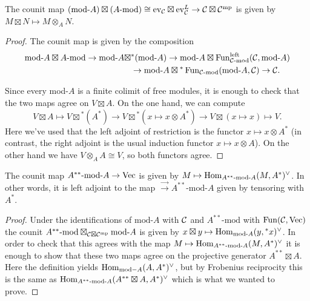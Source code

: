 \documentclass{amsart}
\begin{document}
\begin{lemma}
The counit map $(\text{mod-}A) \boxtimes (A\text{-mod}) \cong \ev_\cC \boxtimes \ev_\cC^L \rightarrow \cC \boxtimes \cC^\mp$ is given by $M \boxtimes N \mapsto M \otimes_A N$.
\end{lemma}
\begin{proof}
The counit map is given by the composition 
\begin{align*}
\text{mod-}A \boxtimes A\text{-mod} \rightarrow \text{mod-}A \boxtimes & {}^*(\text{mod-}A) \rightarrow \text{mod-}A \boxtimes \Fun_{\cC\text{-mod}}^{\text{left}}(\cC, \text{mod-}A) \\ 
& \rightarrow \text{mod-}A \boxtimes {}^*\Fun_{\cC\text{-mod}}(\text{mod-}A, \cC) \rightarrow \cC.
\end{align*}

Since every mod-$A$ is a finite colimit of free modules, it is enough to check that the two maps agree on $V \boxtimes A$.  On the one hand,
we can compute $$V \boxtimes A \mapsto V \boxtimes {}^*(A^*) \rightarrow V \boxtimes {}^*(x \mapsto x \otimes A^*) \rightarrow V \boxtimes (x \mapsto x) \mapsto V.$$  Here we've used that the left adjoint of restriction is the functor $x \mapsto x \otimes A^*$ (in contrast, the right adjoint is the usual induction functor $x \mapsto x \otimes A$).  On the other hand we have $V \otimes_A A \cong V$, so both functors agree.
\end{proof}

\begin{lemma}
The counit map $A^{**}\text{-mod-}A \rightarrow \Vec$ is given by $M \mapsto \Hom_{A^{**}\text{-mod-}A}(M, A^*)^\vee$.  In other words, it is left adjoint to the map $\Vec \rightarrow A^{**}\text{-mod-}A$ given by tensoring with $A^*$.
\end{lemma}
\begin{proof}
Under the identifications of $\text{mod-}A$ with $\cC$ and $A^{**}\text{-mod}$ with $\Fun(\cC, \Vec)$ the counit $A^{**}\text{-mod} \boxtimes_{\cC \boxtimes \cC^\mp} \text{mod-}A$ is given by $x \boxtimes y \mapsto \Hom_{\text{mod-}A}(y, {}^*x)^\vee$.  In order to check that this agrees with the map $M \mapsto \Hom_{A^{**}\text{-mod-}A}(M, A^*)^\vee$ it is enough to show that these two maps agree on the projective generator $A^{**} \boxtimes A$.  Here the definition yields $\Hom_{\text{mod}-A}(A, A^*)^\vee$, but by Frobenius reciprocity this is the same as $\Hom_{A^{**}\text{-mod-}A}(A^{**} \boxtimes A, A^*)^\vee$ which is what we wanted to prove.
\end{proof}
\end{document}
